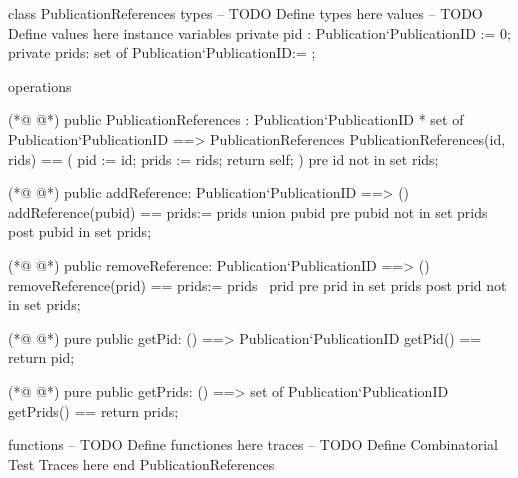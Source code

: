 \begin{vdmpp}[breaklines=true]
class PublicationReferences
types
-- TODO Define types here
values
-- TODO Define values here
instance variables
 private pid : Publication`PublicationID := 0;
 private prids: set of Publication`PublicationID:= {};
 
operations

(*@
\label{PublicationReferences:12}
@*)
 public PublicationReferences : Publication`PublicationID * set of Publication`PublicationID
                 ==> PublicationReferences
    PublicationReferences(id, rids) ==
    (
     pid := id;
     prids := rids;
     return self;
    )
    pre id not in set rids;
                 
(*@
\label{addReference:22}
@*)
 public addReference: Publication`PublicationID ==> ()
 addReference(pubid) ==
 prids:= prids union {pubid}
 pre pubid not in set prids
 post pubid in set prids;
 
(*@
\label{removeReference:28}
@*)
 public removeReference: Publication`PublicationID ==> ()
 removeReference(prid) ==
 prids:= prids \ {prid}
 pre prid in set prids
 post prid not in set prids;
 
(*@
\label{getPid:34}
@*)
 pure public getPid: () ==> Publication`PublicationID
 getPid() == return pid;
 
(*@
\label{getPrids:37}
@*)
 pure public getPrids: () ==> set of Publication`PublicationID
 getPrids() == return prids;
 
 
functions
-- TODO Define functiones here
traces
-- TODO Define Combinatorial Test Traces here
end PublicationReferences
\end{vdmpp}
